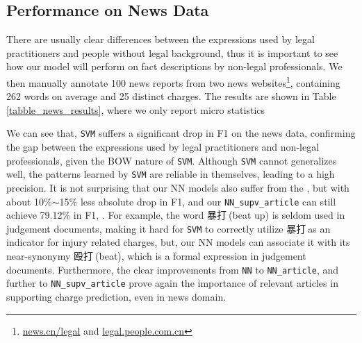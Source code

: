 \subsection{Performance on News Data}
There are usually 
clear %
differences between the expressions used by legal practitioners and people without legal background, 
thus it is important to see how our model will perform on fact descriptions  by non-legal professionals.
%
We then manually annotate 100 news reports %
from two news websites\footnote{\url{news.cn/legal} and \url{legal.people.com.cn}},
containing 262 words on average and 25 distinct charges.
%
The results are shown in Table \ref{tabble_news_results}, where we only report micro statistics 

We can see that, \texttt{SVM} suffers a significant drop in F1 on the news data, %
confirming the gap between the expressions used by legal practitioners and non-legal professionals,
given the BOW nature of \texttt{SVM}.
Although \texttt{SVM} cannot generalizes well, the patterns learned by \texttt{SVM} are reliable in themselves, leading to a high precision.
It is not surprising that our NN models also suffer from the , but with about 10\%$\sim$15\% less absolute drop in F1, and our  \texttt{NN\_supv\_article} can still achieve 79.12\% in F1, .
For example, the word 暴打$\ $(beat up) is seldom used in judgement documents,
making it hard for \texttt{SVM} to correctly utilize  暴打$\ $as an indicator for injury related charges, but, %
our NN models can associate it with its  near-synonymy  殴打$\ $(beat), which is a formal expression in judgement documents.
Furthermore, the clear improvements from \texttt{NN} to \texttt{NN\_article}, and further to \texttt{NN\_supv\_article} prove again the importance of relevant articles 
in supporting charge prediction, even in news domain.


